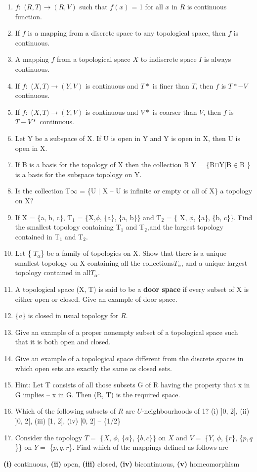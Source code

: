 \documentclass[12pt]{amsart}
\begin{document}
\begin{enumerate}
\item $f:$ ($R, T)\to (R, V)$ such that $f (x)$ = 1 for all $x$ in $R$ is continuous function.
\item If $f$ is a mapping from a discrete space to any topological space, then $f$ is continuous.
\item A mapping $f$ from a topological space $X$ to indiscrete space $I$ is always continuous.
\item If $f:$ ($X, T)\to (Y, V)$ is continuous and $T*$ is finer than $T$, then $f$ is $T*-V$ continuous.
\item If $f :$ ($X, T)\to (Y, V)$ is continuous and $V*$ is coarser than $V$, then $f$ is $T-V*$ continuous.
\item Let Y be a subspace of X. If U is open in Y and Y is open in X, then U is open in X.
\item If B is a basis for the topology of X then the collection B Y = {\{}B$\cap $Y$\vert $B$\in $B {\}} is a basis for the subspace topology on Y.
\item Is the collection T$\infty $ = {\{}U $\vert $ X -- U is infinite or empty or all of X{\}} a topology on X?
\item If X = {\{}a, b, c{\}}, T$_{1}$ = {\{}X,$\phi $, {\{}a{\}}, {\{}a, b{\}}{\}} and T$_{2}$ = {\{} X, $\phi $, {\{}a{\}}, {\{}b, c{\}}{\}}. Find the smallest topology containing T$_{1}$ and T$_{2}$,$_{ }$and the largest topology contained in T$_{1}$ and T$_{2}$.
\item Let {\{} $T_\alpha ${\}} be a family of topologies on X. Show that there is a unique smallest topology on X containing all the collections$T_\alpha $, and a unique largest topology contained in all$T_\alpha $.
\item A topological space (X, T) is said to be a \textbf{door space} if every subset of X is either open or closed. Give an example of door space.
\item {\{}$a${\}} is closed in usual topology for $R$.
\item Give an example of a proper nonempty subset of a topological space such that it is both open and closed.
\item Give an example of a topological space different from the discrete spaces in which open sets are exactly the same as closed sets.
\item Hint: Let T consists of all those subsets G of R having the property that x in G implies -- x in G. Then (R, T) is the required space. 
\item Which of the following subsets of $R$ are $U$-neighbourhoods of 1? (i) ]0, 2], (ii) ]0, 2[, (iii) [1, 2], (iv) [0, 2] -- {\{}1/2{\}}
\item Consider the topology $T =$ {\{}$X$, $\phi $, {\{}$a${\}}, {\{}$b, c${\}}{\}} on $X$ and $V =$ {\{}$Y$, $\phi $, {\{}$r${\}}, {\{}$p, q${\}}{\}} on $Y =$ {\{}$p, q, r${\}}. Find which of the mappings defined as follows are 
\end{enumerate}
\textbf{(i)} continuous, \textbf{(ii)} open, \textbf{(iii)} closed, 
\textbf{(iv)} bicontinuous, \textbf{(v)} homeomorphism 
\end{document}
